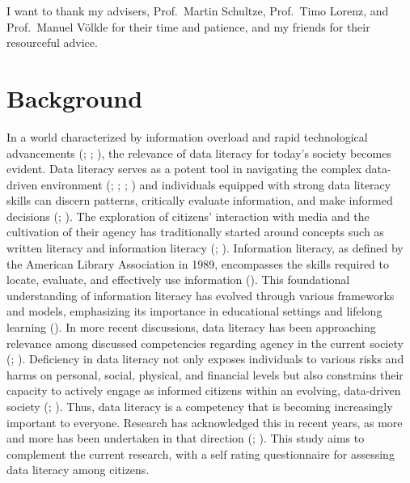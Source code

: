 \documentclass[
  12pt,
  a4paper,
  twoside]{article}
\begin{document}
I want to thank my advisers, Prof.~Martin Schultze, Prof.~Timo Lorenz, and Prof.~Manuel Völkle for their time and patience, and my friends for their resourceful advice.

\newpage\null\thispagestyle{empty}\newpage

\section{Background}\label{background}

In a world characterized by information overload and rapid technological advancements (; ; ), the relevance of data literacy for today's society becomes evident. Data literacy serves as a potent tool in navigating the complex data-driven environment (; ; ; ) and individuals equipped with strong data literacy skills can discern patterns, critically evaluate information, and make informed decisions (; ).
The exploration of citizens' interaction with media and the cultivation of their agency has traditionally started around concepts such as written literacy and information literacy (; ). Information literacy, as defined by the American Library Association in 1989, encompasses the skills required to locate, evaluate, and effectively use information (). This foundational understanding of information literacy has evolved through various frameworks and models, emphasizing its importance in educational settings and lifelong learning (). In more recent discussions, data literacy has been approaching relevance among discussed competencies regarding agency in the current society (; ). Deficiency in data literacy not only exposes individuals to various risks and harms on personal, social, physical, and financial levels but also constrains their capacity to actively engage as informed citizens within an evolving, data-driven society (; ). Thus, data literacy is a competency that is becoming increasingly important to everyone. Research has acknowledged this in recent years, as more and more has been undertaken in that direction (; ). This study aims to complement the current research, with a self rating questionnaire for assessing data literacy among citizens.
\end{document}
